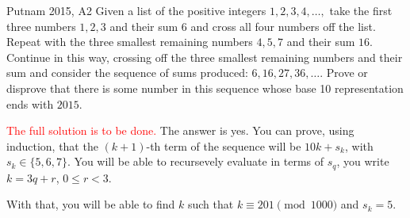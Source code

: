 \begin{prob}{Putnam 2015, A2}{}
	Given a list of the positive integers $1,2,3,4,\dots,$ take the first three numbers $1,2,3$ and their sum $6$ and cross all four numbers off the list. Repeat with the three smallest remaining numbers $4,5,7$ and their sum $16.$ Continue in this way, crossing off the three smallest remaining numbers and their sum and consider the sequence of sums produced: $6,16,27, 36, \dots.$ Prove or disprove that there is some number in this sequence whose base 10 representation ends with $2015.$
\end{prob}

\begin{sk}{}{}
	\textcolor{red}{The full solution is to be done.} The answer is yes. You can prove, using induction, that the \((k+1)\)-th term of the sequence will be \(10k + s_k\), with \(s_k \in \{5, 6, 7\}\). You will be able to recursevely evaluate in terms of \(s_q\), you write \(k = 3q + r\), \(0 \leq r < 3\).

	With that, you will be able to find \(k\) such that \(k \equiv 201 \pmod 1000\) and \(s_k = 5\).
\end{sk}

